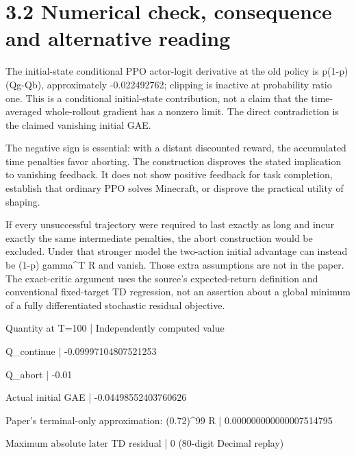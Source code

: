 \documentclass[10pt]{article}
\begin{document}
\section*{3.2 Numerical check, consequence and alternative reading}
The initial-state conditional PPO actor-logit derivative at the old policy is p(1-p)(Qg-Qb), approximately -0.022492762; clipping is inactive at probability ratio one. This is a conditional initial-state contribution, not a claim that the time-averaged whole-rollout gradient has a nonzero limit. The direct contradiction is the claimed vanishing initial GAE.\par
The negative sign is essential: with a distant discounted reward, the accumulated time penalties favor aborting. The construction disproves the stated implication to vanishing feedback. It does not show positive feedback for task completion, establish that ordinary PPO solves Minecraft, or disprove the practical utility of shaping.\par
If every unsuccessful trajectory were required to last exactly as long and incur exactly the same intermediate penalties, the abort construction would be excluded. Under that stronger model the two-action initial advantage can instead be (1-p) gamma\textasciicircum{}T R and vanish. Those extra assumptions are not in the paper. The exact-critic argument uses the source’s expected-return definition and conventional fixed-target TD regression, not an assertion about a global minimum of a fully differentiated stochastic residual objective.\par
Quantity at T=100 | Independently computed value\par
Q\_continue | -0.09997104807521253\par
Q\_abort | -0.01\par
Actual initial GAE | -0.04498552403760626\par
Paper’s terminal-only approximation: (0.72)\textasciicircum{}99 R | 0.000000000000007514795\par
Maximum absolute later TD residual | 0 (80-digit Decimal replay)\par
\end{document}
